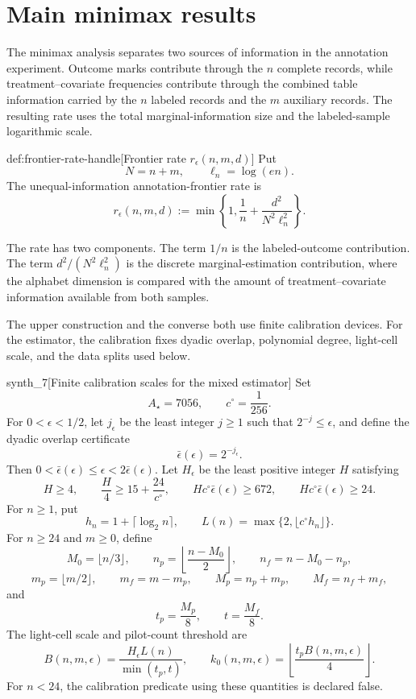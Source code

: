 \section{Main minimax results}\label{sec:main-results}

The minimax analysis separates two sources of information in the annotation experiment. Outcome marks contribute through the \(n\) complete records, while treatment--covariate frequencies contribute through the combined table information carried by the \(n\) labeled records and the \(m\) auxiliary records. The resulting rate uses the total marginal-information size  and the labeled-sample logarithmic scale.

\begin{definitionv}{def:frontier-rate-handle}[Frontier rate \(r_\epsilon(n,m,d)\)]
Put
\[
N=n+m,
\qquad
\ell_n=\log(en).
\]
The unequal-information annotation-frontier rate is
\[
r_\epsilon(n,m,d)
:=
\min\!\left\{
1,\frac1n+\frac{d^2}{N^2\ell_n^2}
\right\}.
\]
\end{definitionv}

The rate  has two components. The term \(1/n\) is the labeled-outcome contribution. The term \(d^2/(N^2\ell_n^2)\) is the discrete marginal-estimation contribution, where the alphabet dimension is compared with the amount of treatment--covariate information available from both samples.

The upper construction and the converse both use finite calibration devices. For the estimator, the calibration fixes dyadic overlap, polynomial degree, light-cell scale, and the data splits used below.

\begin{definitionv}{synth_7}[Finite calibration scales for the mixed estimator]
Set
\[
A_\star=7056,\qquad c^\circ=\frac1{256}.
\]
For \(0<\epsilon<1/2\), let \(j_\epsilon\) be the least integer \(j\ge1\) such that \(2^{-j}\le\epsilon\), and define the dyadic overlap certificate
\[
\bar\epsilon(\epsilon)=2^{-j_\epsilon}.
\]
Then \(0<\bar\epsilon(\epsilon)\le\epsilon<2\bar\epsilon(\epsilon)\). Let \(H_\epsilon\) be the least positive integer \(H\) satisfying
\[
H\ge4,\qquad \frac H4\ge15+\frac{24}{c^\circ},\qquad
Hc^\circ\bar\epsilon(\epsilon)\ge672,\qquad
Hc^\circ\bar\epsilon(\epsilon)\ge24.
\]
For \(n\ge1\), put
\[
h_n=1+\lceil\log_2 n\rceil,\qquad
L(n)=\max\{2,\lfloor c^\circ h_n\rfloor\}.
\]
For \(n\ge24\) and \(m\ge0\), define
\[
M_0=\lfloor n/3\rfloor,\qquad
n_p=\left\lfloor\frac{n-M_0}{2}\right\rfloor,\qquad
n_f=n-M_0-n_p,
\]
\[
m_p=\lfloor m/2\rfloor,\qquad m_f=m-m_p,\qquad
M_p=n_p+m_p,\qquad M_f=n_f+m_f,
\]
and
\[
t_p=\frac{M_p}{8},\qquad t=\frac{M_f}{8}.
\]
The light-cell scale and pilot-count threshold are
\[
B(n,m,\epsilon)=\frac{H_\epsilon L(n)}{\min(t_p,t)},\qquad
k_0(n,m,\epsilon)=\left\lfloor\frac{t_p B(n,m,\epsilon)}4\right\rfloor .
\]
For \(n<24\), the calibration predicate using these quantities is declared false.
\end{definitionv}

